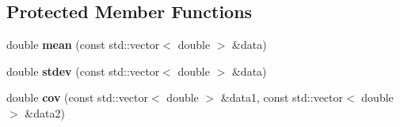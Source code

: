 \subsection*{Protected Member Functions}
\begin{DoxyCompactItemize}
\item 
\hypertarget{classubana_1_1TrackQuality_a3531c526766c41252ee2d23efca61fd3}{double {\bfseries mean} (const std\-::vector$<$ double $>$ \&data)}\label{classubana_1_1TrackQuality_a3531c526766c41252ee2d23efca61fd3}

\item 
\hypertarget{classubana_1_1TrackQuality_a38b40e1148782496b9c1896476eeae63}{double {\bfseries stdev} (const std\-::vector$<$ double $>$ \&data)}\label{classubana_1_1TrackQuality_a38b40e1148782496b9c1896476eeae63}

\item 
\hypertarget{classubana_1_1TrackQuality_a66bce548876df8a07ba4cfa78dadf721}{double {\bfseries cov} (const std\-::vector$<$ double $>$ \&data1, const std\-::vector$<$ double $>$ \&data2)}\label{classubana_1_1TrackQuality_a66bce548876df8a07ba4cfa78dadf721}

\end{DoxyCompactItemize}
